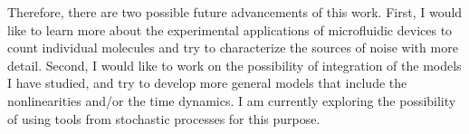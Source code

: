 Therefore, there are two possible future advancements of this work. First, I would like to learn more about the experimental applications of microfluidic devices to count individual molecules and try to characterize the sources of noise with more detail. Second, I would like to work on the possibility of integration of the models I have studied, and try to develop more general models that include the nonlinearities and/or the time dynamics. I am currently exploring the possibility of using tools from stochastic processes for this purpose.




